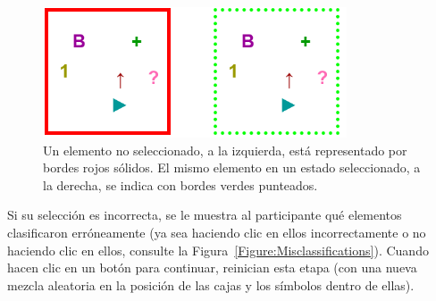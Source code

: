 \begin{figure}[h!] 
\begin{center}
    	\includegraphics[scale=0.6]{papers/images_behavior_research_methods/SelectionSeparadosIguales.png}
	\caption{
	Un elemento no seleccionado, a la izquierda, está representado por bordes rojos sólidos. El mismo elemento en un estado seleccionado, a la derecha, se indica con bordes verdes punteados.}
	\label{Figure:ElementSquares}
\end{center}
\end{figure}

Si su selección es incorrecta, se le muestra al participante qué elementos clasificaron erróneamente (ya sea haciendo clic en ellos incorrectamente o no haciendo clic en ellos, consulte la Figura~\ref{Figure:Misclassifications}). Cuando hacen clic en un botón para continuar, reinician esta etapa (con una nueva mezcla aleatoria en la posición de las cajas y los símbolos dentro de ellas).

